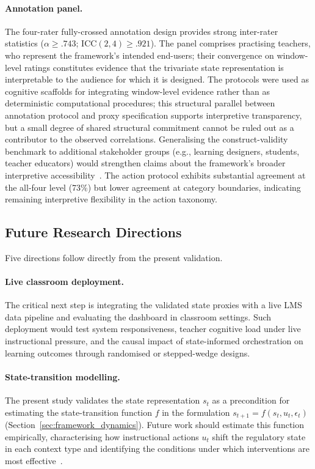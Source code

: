 \documentclass[preprint,12pt,authoryear]{elsarticle}
\begin{document}
\paragraph{Annotation panel.}
The four-rater fully-crossed annotation design provides strong inter-rater statistics ($\alpha \geq .743$; ICC$(2,4) \geq .921$). The panel comprises practising teachers, who represent the framework's intended end-users; their convergence on window-level ratings constitutes evidence that the trivariate state representation is interpretable to the audience for which it is designed. The protocols were used as cognitive scaffolds for integrating window-level evidence rather than as deterministic computational procedures; this structural parallel between annotation protocol and proxy specification supports interpretive transparency, but a small degree of shared structural commitment cannot be ruled out as a contributor to the observed correlations. Generalising the construct-validity benchmark to additional stakeholder groups (e.g., learning designers, students, teacher educators) would strengthen claims about the framework's broader interpretive accessibility~\citep{landis1977, dollinger2019}. The action protocol exhibits substantial agreement at the all-four level (73\%) but lower agreement at category boundaries, indicating remaining interpretive flexibility in the action taxonomy.

\subsection{Future Research Directions}
\label{sec:future}

Five directions follow directly from the present validation.

\paragraph{Live classroom deployment.}
The critical next step is integrating the validated state proxies with a live LMS data pipeline and evaluating the dashboard in classroom settings. Such deployment would test system responsiveness, teacher cognitive load under live instructional pressure, and the causal impact of state-informed orchestration on learning outcomes through randomised or stepped-wedge designs.

\paragraph{State-transition modelling.}
The present study validates the state representation $s_t$ as a precondition for estimating the state-transition function $f$ in the formulation $s_{t+1} = f(s_t, u_t, \epsilon_t)$ (Section~\ref{sec:framework_dynamics}). Future work should estimate this function empirically, characterising how instructional actions $u_t$ shift the regulatory state in each context type and identifying the conditions under which interventions are most effective~\citep{jarvela2023b, zheng2022}.
\end{document}

